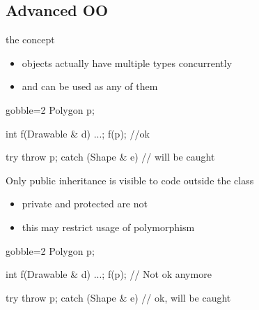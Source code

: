 \subsection[advOO]{Advanced OO}

\begin{frame}[fragile]
  \begin{block}{the concept}
    \begin{itemize}
    \item objects actually have multiple types concurrently
    \item and can be used as any of them
    \end{itemize}
  \end{block}
  \begin{multicols}{2}
    \begin{cppcode*}{gobble=2}
      Polygon p;

      int f(Drawable & d) {...};
      f(p);  //ok

      try {
        throw p;
      } catch (Shape & e) {
        // will be caught
      }
    \end{cppcode*}
    \columnbreak
    \center
  \end{multicols}
\end{frame}


\begin{frame}[fragile]
  \begin{block}{Only public inheritance is visible to code outside the class}
    \begin{itemize}
    \item private and protected are not
    \item this may restrict usage of polymorphism
    \end{itemize}
  \end{block}
  \begin{multicols}{2}
    \begin{cppcode*}{gobble=2}
      Polygon p;

      int f(Drawable & d) {...};
      f(p);  // Not ok anymore

      try {
        throw p;
      } catch (Shape & e) {
        // ok, will be caught
      }
    \end{cppcode*}
    \columnbreak
    \center
  \end{multicols}
\end{frame}

